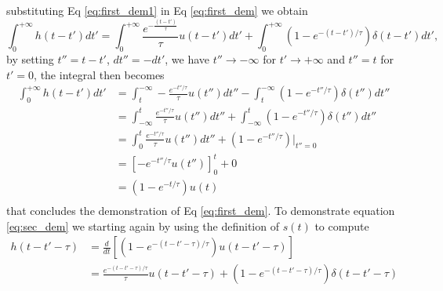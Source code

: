 substituting Eq \ref{eq:first_dem1} in Eq \ref{eq:first_dem} we obtain \begin{equation}
    \int_{0}^{+\infty} h(t - t') dt' = \int_{0}^{+\infty} \frac{e^{-\frac{(t - t')}{\tau}}}{\tau} u(t - t') dt' + \int_{0}^{+\infty} \left(1 - e^{-(t - t')/\tau} \right) \delta(t - t') dt',
\end{equation}
by setting $t'' = t-t'$, $dt''=-dt'$,  we have $t''\rightarrow -\infty$ for $t'\rightarrow +\infty$ and $t''= t$ for $t'= 0$, the integral then becomes
\begin{align}
    \int_{0}^{+\infty} h(t - t') dt' &= \int_{t}^{-\infty} -\frac{e^{-t''/\tau}}{\tau} u(t'') dt'' - \int_{t}^{-\infty} \left(1 - e^{-t''/\tau} \right) \delta(t'') dt'' \\
    &= \int_{-\infty}^{t} \frac{e^{-t''/\tau}}{\tau} u(t'') dt'' + \int_{-\infty}^{t} \left(1 - e^{-t''/\tau} \right) \delta(t'') dt''\\
    &= \int_{0}^{t} \frac{e^{-t''/\tau}}{\tau} u(t'') dt'' + \left(1 - e^{-t''/\tau} \right) \Big|_{t''=0}\\
    &= \left[ -e^{-t''/\tau} u(t'') \right]_{0}^{t} + 0\\
    &= (1 - e^{-t/\tau}) u(t)\\
\end{align}
that concludes the demonstration of Eq \ref{eq:first_dem}.
To demonstrate equation \ref{eq:sec_dem} we starting again by using the definition of $s(t)$ to compute 
\begin{align}
    h(t -t'-\tau) &= \frac{d}{dt} \left[ \left(1 - e^{-(t-t'-\tau)/\tau} \right) u(t-t'-\tau) \right] \\
    &= \frac{e^{-(t-t'-\tau)/\tau}}{\tau} u(t-t'-\tau) + \left(1 - e^{-(t-t'-\tau)/\tau} \right) \delta(t-t'-\tau)\\ \label{eq:sec_dem2}
\end{align}

